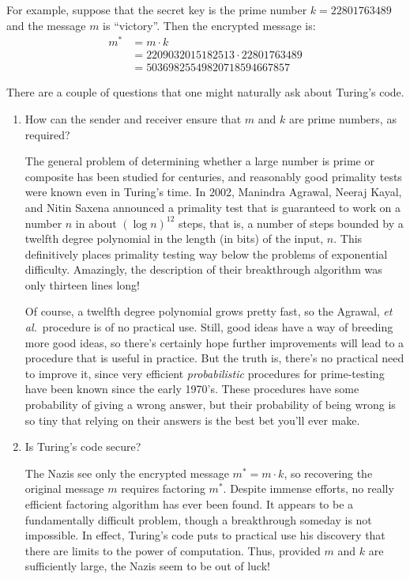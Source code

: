For example, suppose that the secret key is the prime number $k =
22801763489$ and the message $m$ is ``victory''.  Then the encrypted
message is:
%
\begin{align*}
m^* & = m \cdot k \\
   & = 2209032015182513 \cdot 22801763489 \\
   & = 50369825549820718594667857
\end{align*}

There are a couple of questions that one might naturally ask about Turing's
code.

\begin{enumerate}

\item How can the sender and receiver ensure that $m$ and $k$ are
prime numbers, as required?

The general problem of determining whether a large number is prime or
composite has been studied for centuries, and reasonably good primality
tests were known even in Turing's time.  In 2002, Manindra Agrawal, Neeraj
Kayal, and Nitin Saxena announced a primality test that is guaranteed to
work on a number $n$ in about $(\log n)^{12}$ steps, that is, a number of
steps bounded by a twelfth degree polynomial in the length (in bits) of
the input, $n$.  This definitively places primality testing way below the
problems of exponential difficulty.  Amazingly, the description of their
breakthrough algorithm was only thirteen lines long!

Of course, a twelfth degree polynomial grows pretty fast, so the
Agrawal,\emph{ et al.}\ procedure is of no practical use.  Still, good
ideas have a way of breeding more good ideas, so there's certainly
hope further improvements will lead to a procedure that is useful in
practice.  But the truth is, there's no practical need to improve it,
since very efficient \emph{probabilistic} procedures for prime-testing
have been known since the early 1970's.  These procedures have some
probability of giving a wrong answer, but their probability of being
wrong is so tiny that relying on their answers is the best bet you'll
ever make.

\item Is Turing's code secure?

The Nazis see only the encrypted message $m^* = m \cdot k$, so
recovering the original message $m$ requires factoring $m^*$.  Despite
immense efforts, no really efficient factoring algorithm has ever been
found.  It appears to be a fundamentally difficult problem, though a
breakthrough someday is not impossible.  In effect, Turing's code puts
to practical use his discovery that there are limits to the power of
computation.  Thus, provided $m$ and $k$ are sufficiently large, the
Nazis seem to be out of luck!

\end{enumerate}

